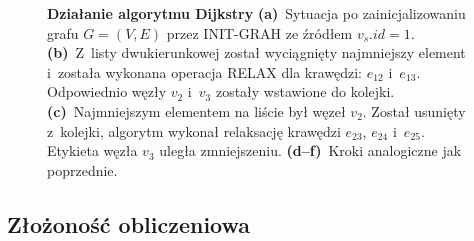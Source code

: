\begin{figure}[!h]
\begin{subfigure}[b]{\textwidth}
\begin{subfigure}[b]{0.3\textwidth}
			\caption{}
			\label{fig:exapleDijkstraDLList:f}
		\end{subfigure}
		\hfill\null
	\end{subfigure}
	\caption{
		\textbf{Działanie algorytmu Dijkstry}
		\textbf{(a)}~Sytuacja po zainicjalizowaniu grafu $G = \left( V, E \right)$ przez \textsf{INIT-GRAH} ze źródłem $v_{s}.id = 1$.
		\textbf{(b)}~Z~listy dwukierunkowej został wyciągnięty najmniejszy element i~została wykonana operacja \textsc{RELAX} dla krawędzi: $e_{12}$ i~$e_{13}$.
		Odpowiednio węzły $v_{2}$ i~$v_{3}$ zostały wstawione do kolejki.
		\textbf{(c)}~Najmniejszym elementem na liście był węzeł $v_{2}$.
		Został usunięty z~kolejki, algorytm wykonał relaksację krawędzi $e_{23}$, $e_{24}$ i~$e_{25}$.
		Etykieta węzła $v_{3}$ uległa zmniejszeniu.
		\textbf{(d--f)}~Kroki analogiczne jak poprzednie.
	}
	\label{fig:exapleDijkstraDLList}
\end{figure}



\subsection{Złożoność obliczeniowa}



